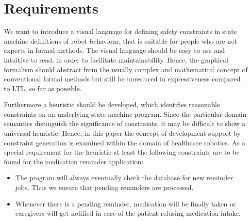 \documentclass[conference]{IEEEtran}
\begin{document}



\section{Requirements}
\label{sec:requirements}


We want to introduce a visual language for defining safety constraints in state machine definitions of robot behaviour, that is suitable for people who are not experts in formal methods. The visual language should be easy to use and intuitive to read, in order to facilitate maintainability.
Hence, the graphical formalism should abstract from the usually complex and mathematical concept of conventional formal methods but still be unreduced in expressiveness compared to LTL, so far as possible.
 
Furthermore a heuristic should be developed, which identifies reasonable constraints on an underlying state machine program. 
Since the particular domain semantics distinguish the significance of constraints, it may be difficult to show a universal heuristic. Hence, in this paper the concept of development support by constraint generation is examined within the domain of healthcare robotics. As a special requirement for the heuristic at least the following constraints are to be found for the medication reminder application:

\begin{itemize}
	\item The program will always eventually check the database for new reminder jobs. Thus we ensure that pending reminders are processed.
	\item Whenever there is a pending reminder, medication will be finally taken or caregivers will get notified in case of the patient refusing medication intake.
\end{itemize}
\end{document}
